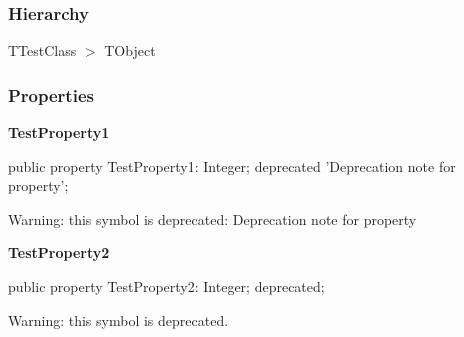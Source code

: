 \documentclass{report}
\newif\ifpdf
\begin{document}
\subsubsection*{\large{\textbf{Hierarchy}}\normalsize\hspace{1ex}\hfill}
TTestClass {$>$} TObject
\subsubsection*{\large{\textbf{Properties}}\normalsize\hspace{1ex}\hfill}
\begin{list}{}{
\setlength{\itemindent}{0cm}
\setlength{\listparindent}{0cm}
\setlength{\leftmargin}{\evensidemargin}
\addtolength{\leftmargin}{\tmplength}
\settowidth{\labelsep}{X}
\addtolength{\leftmargin}{\labelsep}
\setlength{\labelwidth}{\tmplength}
}
\label{ok_deprecated_directive_note.TTestClass-TestProperty1}
\item[\textbf{TestProperty1}\hfill]
\ifpdf
\begin{flushleft}
\fi
\begin{ttfamily}
public property TestProperty1: Integer; deprecated 'Deprecation note for property';\end{ttfamily}

\ifpdf
\end{flushleft}
\fi


\par Warning: this symbol is deprecated: Deprecation note for property

 \label{ok_deprecated_directive_note.TTestClass-TestProperty2}
\item[\textbf{TestProperty2}\hfill]
\ifpdf
\begin{flushleft}
\fi
\begin{ttfamily}
public property TestProperty2: Integer; deprecated;\end{ttfamily}

\ifpdf
\end{flushleft}
\fi


\par Warning: this symbol is deprecated.

 \end{list}
\end{document}
